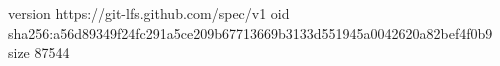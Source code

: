 version https://git-lfs.github.com/spec/v1
oid sha256:a56d89349f24fc291a5ce209b67713669b3133d551945a0042620a82bef4f0b9
size 87544
